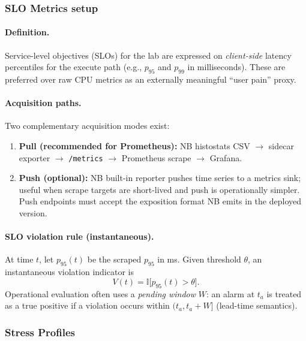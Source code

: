 \documentclass[11pt,a4paper]{article}
\begin{document}
\subsubsection{SLO Metrics setup}
\label{subsubsec:slo}

\paragraph{Definition.}
Service-level objectives (SLOs) for the lab are expressed on \emph{client-side} latency percentiles for the execute path (e.g., $p_{95}$ and $p_{99}$ in milliseconds). These are preferred over raw CPU metrics as an externally meaningful ``user pain'' proxy.

\paragraph{Acquisition paths.}
Two complementary acquisition modes exist:
\begin{enumerate}[leftmargin=*]
  \item \textbf{Pull (recommended for Prometheus):} NB histostats CSV $\rightarrow$ sidecar exporter $\rightarrow$ \texttt{/metrics} $\rightarrow$ Prometheus scrape $\rightarrow$ Grafana.
  \item \textbf{Push (optional):} NB built-in reporter pushes time series to a metrics sink; useful when scrape targets are short-lived and push is operationally simpler. Push endpoints must accept the exposition format NB emits in the deployed version.
\end{enumerate}

\paragraph{SLO violation rule (instantaneous).}
At time $t$, let $p_{95}(t)$ be the scraped $p_{95}$ in ms. Given threshold $\theta$, an instantaneous violation indicator is
\begin{equation}
  V(t) = \mathbb{I}\big[p_{95}(t) > \theta\big].
\end{equation}
Operational evaluation often uses a \emph{pending window} $W$: an alarm at $t_a$ is treated as a true positive if a violation occurs within $(t_a, t_a+W]$ (lead-time semantics).

\subsubsection{Stress Profiles}
\label{subsubsec:profiles}
\end{document}
